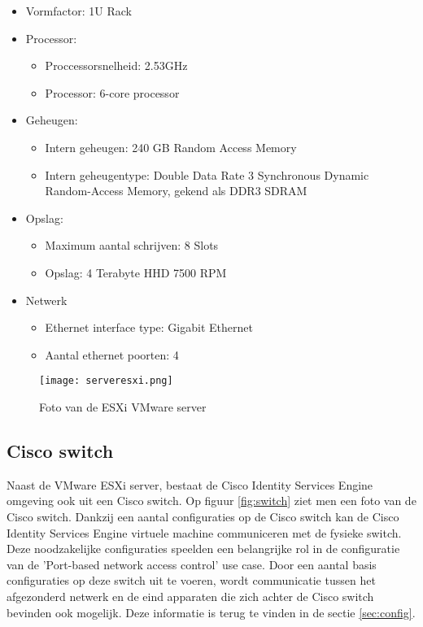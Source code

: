 \begin{itemize}
	\item Vormfactor: 1U Rack
	\item Processor:
	\begin{itemize}
		\item Proccessorsnelheid: 2.53GHz
		\item Processor: 6-core processor
	\end{itemize}
	\item Geheugen:
	\begin{itemize}
		\item Intern geheugen: 240 GB Random Access Memory
		\item Intern geheugentype: Double Data Rate 3 Synchronous Dynamic Random-Access Memory, gekend als DDR3 SDRAM
	\end{itemize}
	\item Opslag:
	\begin{itemize}
		\item Maximum aantal schrijven: 8 Slots
		\item Opslag: 4 Terabyte HHD 7500 RPM
	\end{itemize}
	\item Netwerk
	\begin{itemize}
		\item Ethernet interface type: Gigabit Ethernet
		\item Aantal ethernet poorten: 4 
	\end{itemize}
\end{itemize}

\begin{figure}[H]
	\centering
	\texttt{[image: serveresxi.png]}
	\caption{Foto van de ESXi VMware server}
	\label{fig:VmwareSer}
\end{figure}
\newpage
\subsection{Cisco switch}
Naast de VMware ESXi server, bestaat de Cisco Identity Services Engine omgeving ook uit een Cisco switch. Op figuur \ref{fig:switch} ziet men een foto van de Cisco switch. Dankzij een aantal configuraties op de Cisco switch kan de Cisco Identity Services Engine virtuele machine communiceren met de fysieke switch. Deze noodzakelijke configuraties speelden een belangrijke rol in de configuratie van de 'Port-based network access control' use case. 
\newline
\newline
Door een aantal basis configuraties op deze switch uit te voeren, wordt communicatie tussen het afgezonderd netwerk en de eind apparaten die zich achter de Cisco switch bevinden ook mogelijk. Deze informatie is terug te vinden in de sectie \ref{sec:config}.



